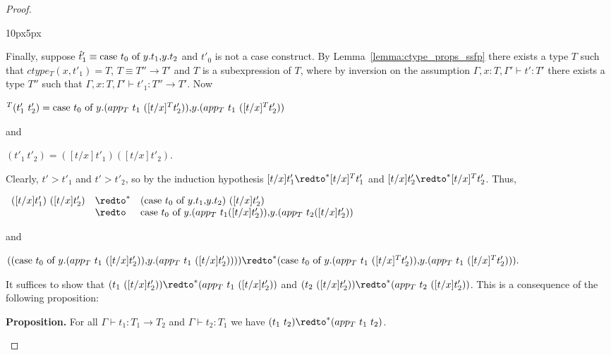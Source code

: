 \begin{proof}
\begin{changemargin}{10px}{5px}
\begin{itemize}
    Finally, suppose $\hat{t}'_1 \equiv \mbox{case}\ t_0\ \text{of}\ y\text{.}t_1\text{,}y\text{.}t_2$ and $t'_0$ is not a case construct.  By Lemma~\ref{lemma:ctype_props_ssfp}
    there exists a type $T$ such that $ctype_T(x,t'_1) = T$, $T \equiv T'' \to T'$ and $T$ is a subexpression
    of $T$, where by inversion on the assumption $\Gamma,x:T,\Gamma' \vdash t':T'$ there exists a type $T''$ such that
    $\Gamma,x:T,\Gamma' \vdash t'_1:T'' \to T'$.  Now 
    \begin{center}
      \begin{math}
        [t/x]^T (t'_1\ t'_2) = \ccon{t_0}{y}{(app_T\ t_1\ ([t/x]^T t'_2))}{(app_T\ t_1\ ([t/x]^T t'_2))}
      \end{math}
    \end{center}
    and
    \begin{center}
      \begin{math}
        [t/x](t'_1\ t'_2) = ([t/x]t'_1)([t/x]t'_2).
      \end{math}
    \end{center}
    Clearly, $t' > t'_1$ and $t' > t'_2$, so by the induction hypothesis $[t/x]t'_1 \redto^* [t/x]^T t'_1$ and $[t/x]t'_2 \redto^* [t/x]^T t'_2$.  Thus,
    \begin{center}
      \begin{math}
        \begin{array}{lll}
          ([t/x]t'_1)\ ([t/x]t'_2) & \redto^* & (\ccon{t_0}{y}{t_1}{t_2})\ ([t/x]t'_2)\\
          & \redto & \ccon{t_0}{y}{(app_T\ t_1 ([t/x]t'_2))}{(app_T\ t_2 ([t/x]t'_2))}
        \end{array}
      \end{math}
    \end{center}
    and
    \begin{center}
      \begin{math}
        ((\ccon{t_0}{y}{(app_T\ t_1\ ([t/x] t'_2))}{(app_T\ t_1\ ([t/x] t'_2))})) \redto^* (\ccon{t_0}{y}{(app_T\ t_1\ ([t/x]^T t'_2))}{(app_T\ t_1\ ([t/x]^T t'_2))}).
      \end{math}
    \end{center}
    It suffices to show that $(t_1\ ([t/x] t'_2)) \redto^* (app_T\ t_1\ ([t/x] t'_2))$ and 
    $(t_2\ ([t/x] t'_2)) \redto^* (app_T\ t_2\ ([t/x] t'_2))$.  This is a consequence of the following proposition:

    {\bf Proposition.} For all $\Gamma \vdash t_1:T_1 \to T_2$ and $\Gamma \vdash t_2:T_1$ we have
    $(t_1\ t_2) \redto^* (app_T\ t_1\ t_2)$.


\end{itemize}
\end{changemargin}
\end{proof}
